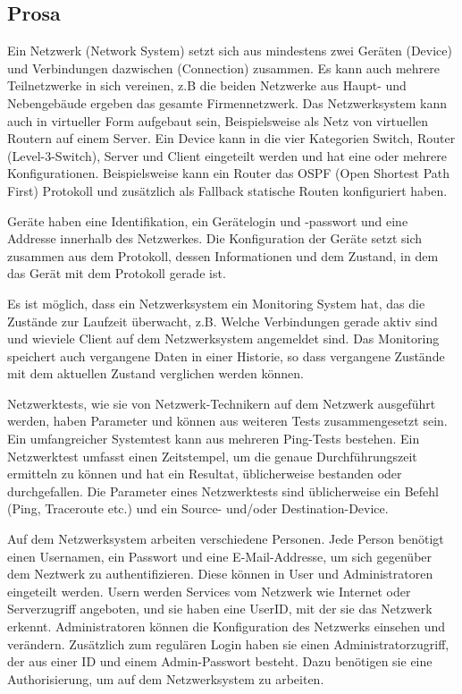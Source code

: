 \documentclass[
	ngerman,
	toc=listof, %
	toc=bibliography, %
	footnotes=multiple, %
	parskip=half, %
	numbers=noendperiod %
]{scrartcl}
\begin{document}
	\subsection{Prosa}
	Ein Netzwerk (Network System) setzt sich aus mindestens zwei Geräten (Device) und Verbindungen dazwischen (Connection) zusammen.
	Es kann auch mehrere Teilnetzwerke in sich vereinen, z.B die beiden Netzwerke aus Haupt- und Nebengebäude ergeben das gesamte Firmennetzwerk.
	Das Netzwerksystem kann auch in virtueller Form aufgebaut sein, Beispielsweise als Netz von virtuellen Routern auf einem Server.
	Ein Device kann in die vier Kategorien Switch, Router (Level-3-Switch), Server und Client eingeteilt werden und hat eine oder mehrere Konfigurationen.
	Beispielsweise kann ein Router das OSPF (Open Shortest Path First) Protokoll und zusätzlich als Fallback statische Routen konfiguriert haben.

	Geräte haben eine Identifikation, ein Gerätelogin und -passwort und eine Addresse innerhalb des Netzwerkes.
	Die Konfiguration der Geräte setzt sich zusammen aus dem Protokoll, dessen Informationen und dem Zustand, in dem das Gerät mit dem Protokoll gerade ist.

	Es ist möglich, dass ein Netzwerksystem ein Monitoring System hat, das die Zustände zur Laufzeit überwacht, z.B. Welche Verbindungen gerade aktiv sind und wieviele Client auf dem Netzwerksystem angemeldet sind.
	Das Monitoring speichert auch vergangene Daten in einer Historie, so dass vergangene Zustände mit dem aktuellen Zustand verglichen werden können.

	Netzwerktests, wie sie von Netzwerk-Technikern auf dem Netzwerk ausgeführt werden, haben Parameter und können aus weiteren Tests zusammengesetzt sein. 
	Ein umfangreicher Systemtest kann aus mehreren Ping-Tests bestehen.
	Ein Netzwerktest umfasst einen Zeitstempel, um die genaue Durchführungszeit ermitteln zu können und hat ein Resultat, üblicherweise bestanden oder durchgefallen.
	Die Parameter eines Netzwerktests sind üblicherweise ein Befehl (Ping, Traceroute etc.) und ein Source- und/oder Destination-Device.

	Auf dem Netzwerksystem arbeiten verschiedene Personen. 
	Jede Person benötigt einen Usernamen, ein Passwort und eine E-Mail-Addresse, um sich gegenüber dem Neztwerk zu authentifizieren.
	Diese können in User und Administratoren eingeteilt werden. 
	Usern werden Services vom Netzwerk wie Internet oder Serverzugriff angeboten, und sie haben eine UserID, mit der sie das Netzwerk erkennt.
	Administratoren können die Konfiguration des Netzwerks einsehen und verändern. 
	Zusätzlich zum regulären Login haben sie einen Administratorzugriff, der aus einer ID und einem Admin-Passwort besteht.
	Dazu benötigen sie eine Authorisierung, um auf dem Netzwerksystem zu arbeiten.
\end{document}
